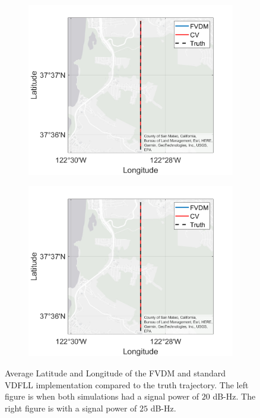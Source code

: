 \begin{figure}[!ht]
    \begin{subfigure}{.45\textwidth}
        \centering
        \includegraphics[width=1\linewidth]{Figures/straight/20/GEOPLOT.png}
    \end{subfigure}%
    \begin{subfigure}{.45\textwidth}
        \centering
        \includegraphics[width=1\linewidth]{Figures/straight/25/GEOPLOT.png}
    \end{subfigure}
    \caption{Average Latitude and Longitude of the FVDM and standard VDFLL implementation compared to the truth trajectory. The left figure is when both simulations had a signal power of \(20\) dB-Hz. The right figure is with a signal power of \(25\) dB-Hz.}\label{fig:GEOPLOT1}
\end{figure}

